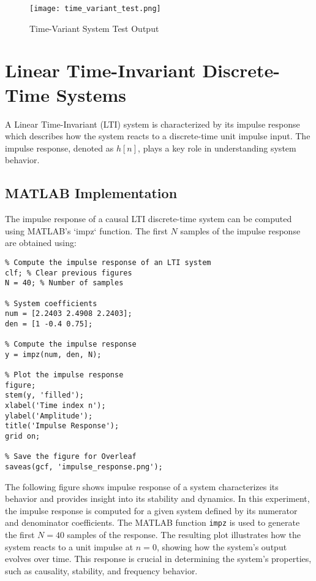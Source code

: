 \documentclass[a4paper,12pt]{article}
\begin{document}
\begin{figure}[H]
    \centering
    \texttt{[image: time\_variant\_test.png]}
    \caption{Time-Variant System Test Output}
    \label{fig:timevariant}
\end{figure}

\section{Linear Time-Invariant Discrete-Time Systems}
A Linear Time-Invariant (LTI) system is characterized by its impulse response which describes how the system reacts to a discrete-time unit impulse input. The impulse response, denoted as \( h[n] \), plays a key role in understanding system behavior.

\subsection{MATLAB Implementation}
The impulse response of a causal LTI discrete-time system can be computed using MATLAB’s `impz` function. The first \( N \) samples of the impulse response are obtained using:

\begin{verbatim}
% Compute the impulse response of an LTI system
clf; % Clear previous figures
N = 40; % Number of samples

% System coefficients
num = [2.2403 2.4908 2.2403]; 
den = [1 -0.4 0.75];

% Compute the impulse response
y = impz(num, den, N);

% Plot the impulse response
figure;
stem(y, 'filled');
xlabel('Time index n');
ylabel('Amplitude');
title('Impulse Response');
grid on;

% Save the figure for Overleaf
saveas(gcf, 'impulse_response.png');
\end{verbatim}

The following figure shows impulse response of a system characterizes its behavior and provides insight into its stability and dynamics. In this experiment, the impulse response is computed for a given system defined by its numerator and denominator coefficients. The MATLAB function \texttt{impz} is used to generate the first \( N = 40 \) samples of the response. The resulting plot illustrates how the system reacts to a unit impulse at \( n = 0 \), showing how the system's output evolves over time. This response is crucial in determining the system's properties, such as causality, stability, and frequency behavior.
\end{document}
